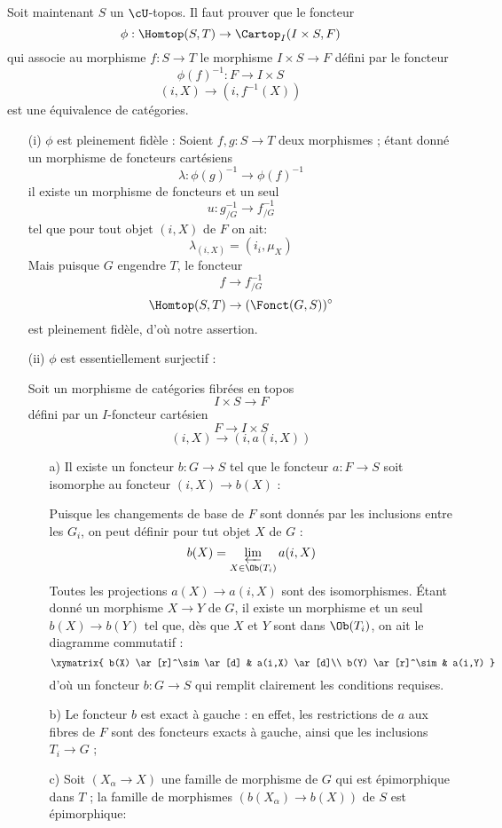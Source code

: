 Soit maintenant $S$ un $\cU$-topos. Il faut prouver que le foncteur
$$
\phi: \Homtop(S, T) \to \Cartop_I(I \times S, F)
$$
qui associe au morphisme $f: S \to T$ le morphisme $I \times S \to F$ défini par le foncteur
$$
\phi(f)^{-1}: F \to I \times S
$$
$$
(i, X) \to (i, f^{-1}(X))
$$
est une équivalence de catégories.
\begin{enumerate}
    \item[(i)] $\phi$ est pleinement fidèle : 
    Soient $f, g: S \to T$ deux morphismes ; étant donné un morphisme de foncteurs cartésiens
    $$
    \lambda: \phi(g)^{-1} \to \phi(f)^{-1}
    $$
    il existe un morphisme de foncteurs et un seul
    $$
    u: g^{-1}_{/G} \to f^{-1}_{/G}
    $$
    tel que pour tout objet $(i, X)$ de $F$ on ait: 
    $$
    \lambda_{(i, X)} = (i_i, \mu_X)
    $$
    Mais puisque $G$ engendre $T$, le foncteur
    $$
    f \to f^{-1}_{/G}
    $$
    $$
    \Homtop(S, T) \to (\Fonct(G, S))^\circ
    $$
    est pleinement fidèle, d'où notre assertion.
    \item[(ii)] $\phi$ est essentiellement surjectif : 
    
    Soit un morphisme de catégories fibrées en topos
    $$
    I \times S \to F
    $$
    défini par un $I$-foncteur cartésien
    $$
    F \to I \times S
    $$
    $$
    (i, X) \to (i, a(i, X))
    $$
    \begin{enumerate}
        \item[a)] Il existe un foncteur $b: G \to S$ tel que le foncteur $a: F \to S$ soit isomorphe au foncteur $(i, X) \to b(X)$ :
        
        Puisque les changements de base de $F$ sont donnés par les inclusions entre les $G_i$, on peut définir pour tut objet $X$ de $G$ :
        $$
        b(X) = \varprojlim_{X \in \Ob(T_i)} a(i, X)
        $$
    Toutes les projections $a(X) \to a(i, X)$ sont des isomorphismes. Étant donné un morphisme $X \to Y$ de $G$, il existe un morphisme et un seul $b(X) \to b(Y)$ tel que, dès que $X$ et $Y$ sont dans $\Ob(T_i)$, on ait le diagramme commutatif :
    $$
        \xymatrix{
            b(X) \ar[r]^\sim \ar[d] & a(i,X) \ar[d]\\
            b(Y) \ar[r]^\sim & a(i,Y)
        }
    $$
     d'où un foncteur $b: G\to S$ qui remplit clairement les conditions requises.
     \item[b)] Le foncteur $b$ est exact à gauche : en effet, les restrictions de $a$ aux fibres de $F$ sont des foncteurs exacts à gauche, ainsi que les inclusions $T_i \to G$ ;
     \item[c)] Soit $(X_\alpha \to X)$ une famille de morphisme de $G$ qui est épimorphique dans $T$ ; la famille de morphismes $(b(X_\alpha) \to b(X))$ de $S$ est épimorphique:
     

\end{enumerate}
\end{enumerate}
